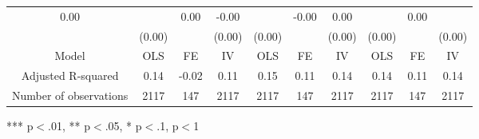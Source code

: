 \begin{tabular}{llllllllll}
  \multicolumn{1}{|c}{0.00 } &
  \multicolumn{1}{c}{} &
  \multicolumn{1}{c}{0.00 } &
  \multicolumn{1}{c}{-0.00 } &
  \multicolumn{1}{c}{} &
  \multicolumn{1}{c}{-0.00 } &
  \multicolumn{1}{c}{0.00 } &
  \multicolumn{1}{c}{} &
  \multicolumn{1}{c}{0.00 } \\
\multicolumn{1}{l}{} &
  \multicolumn{1}{|c}{(0.00)} &
  \multicolumn{1}{c}{} &
  \multicolumn{1}{c}{(0.00)} &
  \multicolumn{1}{c}{(0.00)} &
  \multicolumn{1}{c}{} &
  \multicolumn{1}{c}{(0.00)} &
  \multicolumn{1}{c}{(0.00)} &
  \multicolumn{1}{c}{} &
  \multicolumn{1}{c}{(0.00)} \\
\multicolumn{1}{c}{Model} &
  \multicolumn{1}{|c}{OLS} &
  \multicolumn{1}{c}{FE} &
  \multicolumn{1}{c}{IV} &
  \multicolumn{1}{c}{OLS} &
  \multicolumn{1}{c}{FE} &
  \multicolumn{1}{c}{IV} &
  \multicolumn{1}{c}{OLS} &
  \multicolumn{1}{c}{FE} &
  \multicolumn{1}{c}{IV} \\
\multicolumn{1}{c}{Adjusted R-squared} &
  \multicolumn{1}{|c}{0.14} &
  \multicolumn{1}{c}{-0.02} &
  \multicolumn{1}{c}{0.11} &
  \multicolumn{1}{c}{0.15} &
  \multicolumn{1}{c}{0.11} &
  \multicolumn{1}{c}{0.14} &
  \multicolumn{1}{c}{0.14} &
  \multicolumn{1}{c}{0.11} &
  \multicolumn{1}{c}{0.14} \\
\multicolumn{1}{c}{Number of observations} &
  \multicolumn{1}{|c}{2117} &
  \multicolumn{1}{c}{147} &
  \multicolumn{1}{c}{2117} &
  \multicolumn{1}{c}{2117} &
  \multicolumn{1}{c}{147} &
  \multicolumn{1}{c}{2117} &
  \multicolumn{1}{c}{2117} &
  \multicolumn{1}{c}{147} &
  \multicolumn{1}{c}{2117} \\
\cline{1-10}
\end{tabular}

\footnotesize{
*** p$<$.01, ** p$<$.05, * p$<$.1,  p$<$1
}
